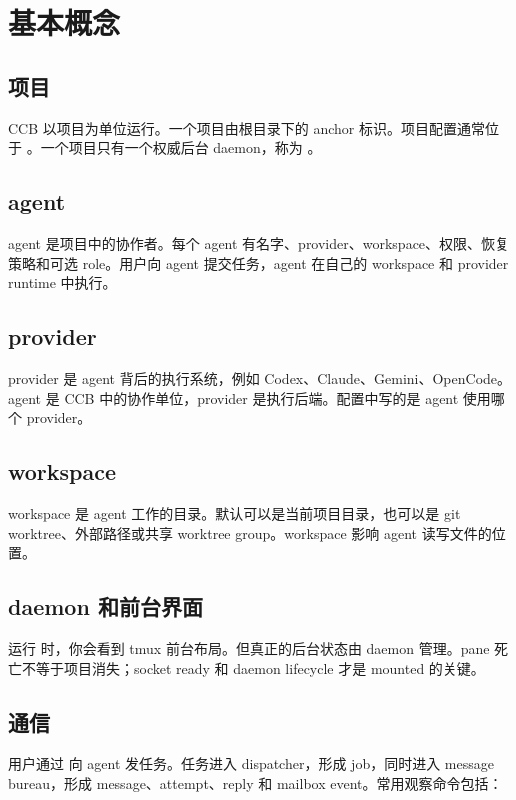 \chapter{基本概念}

\section{项目}

CCB 以项目为单位运行。一个项目由根目录下的  anchor 标识。项目配置通常位于 。一个项目只有一个权威后台 daemon，称为 。

\section{agent}

agent 是项目中的协作者。每个 agent 有名字、provider、workspace、权限、恢复策略和可选 role。用户向 agent 提交任务，agent 在自己的 workspace 和 provider runtime 中执行。

\section{provider}

provider 是 agent 背后的执行系统，例如 Codex、Claude、Gemini、OpenCode。agent 是 CCB 中的协作单位，provider 是执行后端。配置中写的是 agent 使用哪个 provider。

\section{workspace}

workspace 是 agent 工作的目录。默认可以是当前项目目录，也可以是 git worktree、外部路径或共享 worktree group。workspace 影响 agent 读写文件的位置。

\section{daemon 和前台界面}

运行  时，你会看到 tmux 前台布局。但真正的后台状态由  daemon 管理。pane 死亡不等于项目消失；socket ready 和 daemon lifecycle 才是 mounted 的关键。

\section{通信}

用户通过  向 agent 发任务。任务进入 dispatcher，形成 job，同时进入 message bureau，形成 message、attempt、reply 和 mailbox event。常用观察命令包括：

